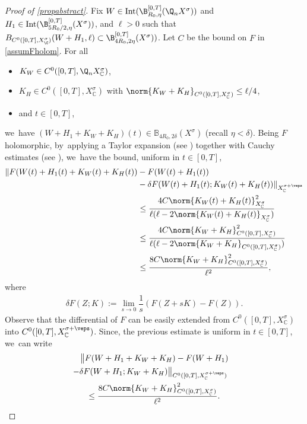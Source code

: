\begin{proof}[Proof of \cref{propabstract}]
Fix $W\in \text{Int}(\B_{R_0, \eta}^{[0, T]}(\Q_nX^\sigma))$ and $H_1\in \text{Int}(\B_{5R_0/2, \eta}^{[0, T]}(X^\sigma))$, and $\ell>0$ such that $B_{C^0([0,T],X_{\C}^\sigma)}(W+H_1,\ell)\subset \B_{4R_0, 2\eta}^{[0, T]}(X^\sigma))$. Let $C$ be the bound on $F$ in \cref{assumFholom}. For all
\begin{itemize}
\item
$K_W\in C^0([0, T], \Q_n X_\mathbb{C}^\sigma)$,
\item
$K_H\in C^0([0, T], X_\mathbb{C}^\sigma)$ with $\norm{K_W+K_H}_{C^0([0, T], X_\mathbb{C}^\sigma)}\leq \ell/4$,
\item
and $t\in [0,T]$,
\end{itemize}
we~have $(W+H_1+K_W+K_H)(t) \in \mathbb{B}_{4R_{0},2\delta}(X^{\sigma})$ (recall $\eta<\delta$). Being $F$ holomorphic, by~applying a Taylor expansion (see \cite[Th.\,7.1, Cor.\,7.3]{Muj86}) together with Cauchy estimates (see \cite[Cor.\,7.4]{Muj86}), we~have the bound, uniform in $t\in [0,T]$,
\begin{align*}
\lVert F(W(t)+H_1(t)+K_W(t)+K_H(t))&-F(W(t)+H_1(t))\\
&-\delta F(W(t)+H_1(t); K_W(t)+K_H(t)) \rVert_{ X_\mathbb{C}^{\sigma+\veps}}\\
&\leq \dfrac{4C\norm{K_W(t)+K_H(t)}_{X_\mathbb{C}^\sigma}^2}{\ell(\ell-2\norm{K_W(t)+K_H(t)}_{X_\mathbb{C}^\sigma})} \\
&\leq \dfrac{4C\norm{K_W+K_H}_{C^0([0, T], X_\mathbb{C}^\sigma)}^2}{\ell(\ell-2\norm{K_W+K_H}_{C^0([0, T], X_\mathbb{C}^\sigma)})}\\
&\leq \dfrac{8C\norm{K_W+K_H}_{C^0([0, T], X_\mathbb{C}^\sigma)}^2}{\ell^2},
\end{align*}
where
\begin{align*}
\delta F(Z; K):=\lim_{s\to 0}\dfrac{1}{s}(F(Z+sK)-F(Z)).
\end{align*}
Observe that the differential of $F$ can be easily extended from $C^0([0, T], X_\mathbb{C}^\sigma)$ into $C^0([0, T], X_\mathbb{C}^{\sigma+\veps})$. Since, the previous estimate is uniform in $t\in [0,T]$, we~can write
\begin{multline}
\bigl\Vert F(W+H_1+K_W+K_H)-F(W+H_1)\\
\shoveright{-\delta F(W+H_1; K_W+K_H)\bigr\Vert_{C^0([0, T], X_\mathbb{C}^{\sigma+\veps})}}\\
\leq \dfrac{8C\norm{K_W+K_H}_{C^0([0, T], X_\mathbb{C}^\sigma)}^2}{\ell^2}.\label{prop:proof:frechet-1}
\end{multline}


\end{proof}
